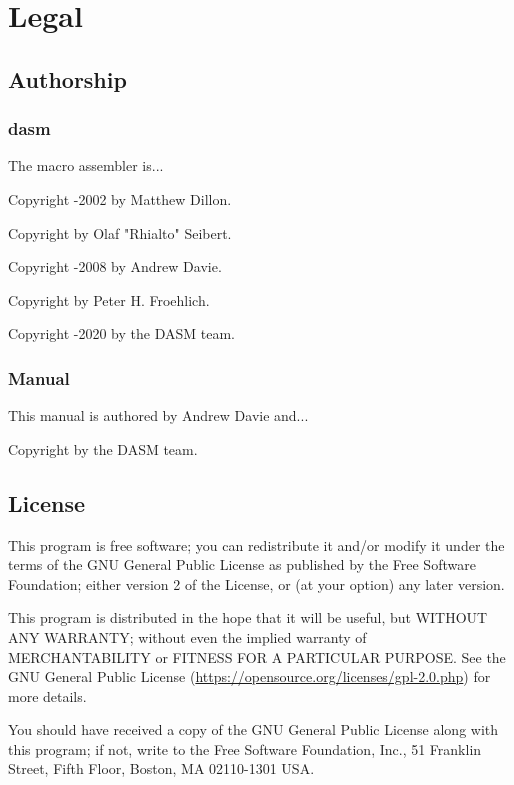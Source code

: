 
 
\chapter{Legal}


\section{Authorship}
\subsection{dasm}

The  macro assembler is...

Copyright -2002 by Matthew Dillon.

Copyright  by Olaf "Rhialto" Seibert.

Copyright -2008 by Andrew Davie.

Copyright  by Peter H. Froehlich.

Copyright -2020 by the DASM team.

\subsection{Manual}
This manual is authored by Andrew Davie and...

Copyright  by the DASM team.

\section{License}

This program is free software; you can redistribute it and/or modify
it under the terms of the GNU General Public License as published by
the Free Software Foundation; either version 2 of the License, or
(at your option) any later version.

This program is distributed in the hope that it will be useful, but WITHOUT ANY WARRANTY; without even the implied warranty of MERCHANTABILITY or FITNESS FOR A PARTICULAR PURPOSE.  See the GNU General Public License (\url{https://opensource.org/licenses/gpl-2.0.php}) for more details.


You should have received a copy of the GNU General Public License along
with this program; if not, write to the Free Software Foundation, Inc.,
51 Franklin Street, Fifth Floor, Boston, MA 02110-1301 USA.


